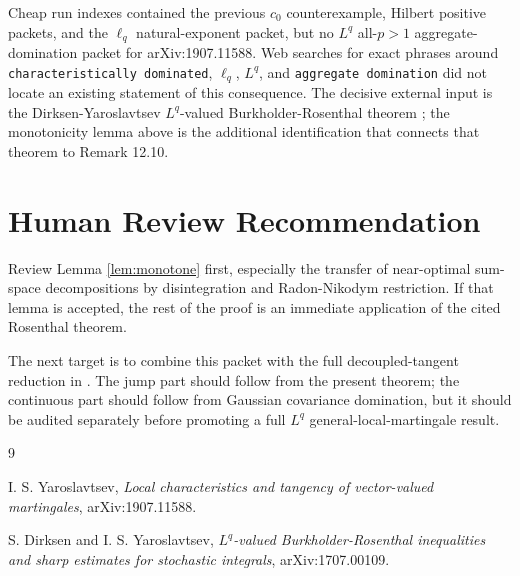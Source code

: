 \documentclass[11pt]{article}
\begin{document}
Cheap run indexes contained the previous \(c_0\) counterexample, Hilbert
positive packets, and the \(\ell_q\) natural-exponent packet, but no
\(L^q\) all-\(p>1\) aggregate-domination packet for arXiv:1907.11588.  Web
searches for exact phrases around \texttt{characteristically dominated},
\(\ell_q\), \(L^q\), and \texttt{aggregate domination} did not locate an
existing statement of this consequence.  The decisive external input is the
Dirksen-Yaroslavtsev \(L^q\)-valued Burkholder-Rosenthal theorem
\cite{DirksenYaroslavtsev2017}; the monotonicity lemma above is the additional
identification that connects that theorem to Remark 12.10.

\section*{Human Review Recommendation}

Review Lemma \ref{lem:monotone} first, especially the transfer of
near-optimal sum-space decompositions by disintegration and
Radon-Nikodym restriction.  If that lemma is accepted, the rest of the proof is
an immediate application of the cited Rosenthal theorem.

The next target is to combine this packet with the full decoupled-tangent
reduction in \cite{Yaroslavtsev2019}.  The jump part should follow from the
present theorem; the continuous part should follow from Gaussian covariance
domination, but it should be audited separately before promoting a full
\(L^q\) general-local-martingale result.

\begin{thebibliography}{9}

I. S. Yaroslavtsev,
\emph{Local characteristics and tangency of vector-valued martingales},
arXiv:1907.11588.

S. Dirksen and I. S. Yaroslavtsev,
\emph{\(L^q\)-valued Burkholder-Rosenthal inequalities and sharp estimates for
stochastic integrals},
arXiv:1707.00109.

\end{thebibliography}
\end{document}
